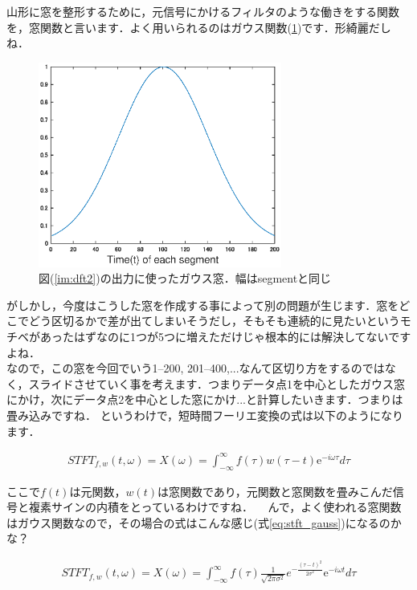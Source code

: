 \documentclass[11pt,a4paper]{ujreport} 	%
\begin{document}
山形に窓を整形するために，元信号にかけるフィルタのような働きをする関数を，窓関数と言います．よく用いられるのはガウス関数(\ref{im:gauss-window})です．形綺麗だしね．

\begin{figure}[H]
  \label{im:gauss-window}
  \centering
  \includegraphics[width=8cm]{../figures/gauss-window.eps}
  \caption{図(\ref{im:dft2})の出力に使ったガウス窓．幅はsegmentと同じ}
\end{figure}

がしかし，今度はこうした窓を作成する事によって別の問題が生じます．窓をどこでどう区切るかで差が出てしまいそうだし，そもそも連続的に見たいというモチベがあったはずなのに1つが5つに増えただけじゃ根本的には解決してないですよね．\\

なので，この窓を今回でいう1--200, 201--400,...なんて区切り方をするのではなく，スライドさせていく事を考えます．つまりデータ点1を中心としたガウス窓にかけ，次にデータ点2を中心とした窓にかけ...と計算したいきます．つまりは畳み込みですね．
というわけで，短時間フーリエ変換の式は以下のようになります．

\begin{eqnarray}
STFT_{f,w}(t, \omega) =X(\omega)= \int_{-\infty}^{\infty} f(\tau)w(\tau - t)\mathrm{e}^{-i\omega \tau} d\tau
\label{eq:stft}
\end{eqnarray}

ここで$f(t)$は元関数，$w(t)$は窓関数であり，元関数と窓関数を畳みこんだ信号と複素サインの内積をとっているわけですね．
　んで，よく使われる窓関数はガウス関数なので，その場合の式はこんな感じ(式\ref{eq:stft_gauss})になるのかな？

\begin{eqnarray}
STFT_{f,w}(t, \omega) = X(\omega) = \int_{-\infty}^{\infty} f(\tau) \frac{1}{\sqrt{2\pi\sigma^2}}e^{-\frac{{(\tau-t)}^2}{2\sigma^2}}\mathrm{e}^{-i\omega t} d\tau
\label{eq:stft_gauss}
\end{eqnarray}
\end{document}
